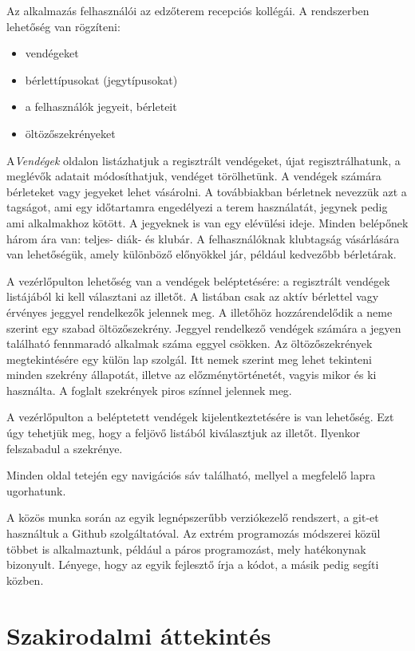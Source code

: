 \documentclass[12pt]{article}
\begin{document}
Az alkalmazás felhasználói az edzőterem recepciós kollégái. A rendszerben lehetőség van rögzíteni:
\begin{itemize}
\item vendégeket
\item bérlettípusokat (jegytípusokat)
\item a felhasználók jegyeit, bérleteit
\item öltözőszekrényeket
\end{itemize}

A\textit{Vendégek} oldalon listázhatjuk a regisztrált vendégeket, újat regisztrálhatunk, a meglévők adatait módosíthatjuk, vendéget törölhetünk. A vendégek számára bérleteket vagy jegyeket lehet vásárolni. A továbbiakban bérletnek nevezzük azt a tagságot, ami egy időtartamra engedélyezi a terem használatát, jegynek pedig ami alkalmakhoz kötött. A jegyeknek is van egy elévülési ideje. Minden belépőnek három ára van: teljes- diák- és klubár. A felhasználóknak klubtagság vásárlására van lehetőségük, amely különböző előnyökkel jár, például kedvezőbb bérletárak.

A vezérlőpulton lehetőség van a vendégek beléptetésére: a regisztrált vendégek listájából ki kell választani az illetőt. A listában csak az aktív bérlettel vagy érvényes jeggyel rendelkezők jelennek meg. A illetőhöz hozzárendelődik a neme szerint egy szabad öltözőszekrény. Jeggyel rendelkező vendégek számára a jegyen található fennmaradó alkalmak száma eggyel csökken. Az öltözőszekrények megtekintésére egy külön lap szolgál. Itt nemek szerint meg lehet tekinteni minden szekrény állapotát, illetve az előzménytörténetét, vagyis mikor és ki használta. A foglalt szekrények piros színnel jelennek meg.

A vezérlőpulton  a beléptetett vendégek kijelentkeztetésére is van lehetőség. Ezt úgy tehetjük meg, hogy a feljövő listából kiválasztjuk az illetőt. Ilyenkor felszabadul a szekrénye. 

Minden oldal tetején egy navigációs sáv található, mellyel a megfelelő lapra ugorhatunk.

A közös munka során az egyik legnépszerűbb verziókezelő rendszert, a git-et használtuk a Github szolgáltatóval. Az extrém programozás módszerei közül többet is alkalmaztunk, például a páros programozást, mely hatékonynak bizonyult. Lényege, hogy az egyik fejlesztő írja a kódot, a másik pedig segíti közben.

\newpage
\section{Szakirodalmi áttekintés}
\end{document}
